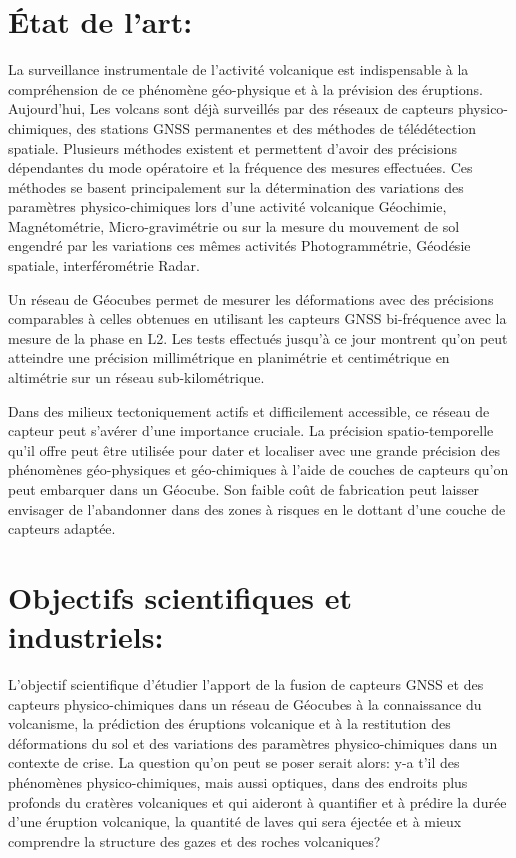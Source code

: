 \documentclass{themeensg}
\begin{document}
\begin{appendices}
\section*{État de l'art:}

La surveillance instrumentale de l'activité volcanique est indispensable à la compréhension de ce phénomène géo-physique et à la prévision des éruptions. Aujourd'hui, Les volcans sont déjà surveillés par des réseaux de capteurs physico-chimiques, des stations GNSS permanentes et des méthodes de télédétection spatiale. Plusieurs méthodes existent et permettent d'avoir des précisions dépendantes du mode opératoire et la fréquence des mesures effectuées. Ces méthodes se basent principalement sur la détermination des variations des paramètres physico-chimiques lors d'une activité volcanique Géochimie, Magnétométrie, Micro-gravimétrie ou sur la mesure du mouvement de sol engendré par les variations ces mêmes activités Photogrammétrie, Géodésie spatiale, interférométrie Radar.

Un réseau de Géocubes permet de mesurer les déformations avec des précisions comparables à celles obtenues en utilisant les capteurs GNSS bi-fréquence avec la mesure de la phase en L2. Les tests effectués jusqu'à ce jour montrent qu'on peut atteindre une précision millimétrique en planimétrie et centimétrique en altimétrie sur un réseau sub-kilométrique.

Dans des milieux tectoniquement actifs et difficilement accessible, ce réseau de capteur peut s'avérer d'une importance cruciale. La précision spatio-temporelle qu'il offre peut être utilisée pour dater et localiser avec une grande précision des phénomènes géo-physiques et géo-chimiques à l'aide de couches de capteurs qu'on peut embarquer dans un Géocube. Son faible coût de fabrication peut laisser envisager de l'abandonner dans des zones à risques en le dottant d'une couche de capteurs adaptée.

\section*{Objectifs scientifiques et industriels:}

L'objectif scientifique d'étudier l'apport de la fusion de capteurs GNSS et des capteurs physico-chimiques dans un réseau de Géocubes à la connaissance du volcanisme, la prédiction des éruptions volcanique et à la restitution des déformations du sol et des variations des paramètres physico-chimiques dans un contexte de crise. La question qu'on peut se poser serait alors: y-a t'il des phénomènes physico-chimiques, mais aussi optiques, dans des endroits plus profonds du cratères volcaniques et qui aideront à quantifier et à prédire la durée d'une éruption volcanique, la quantité de laves qui sera éjectée et à mieux comprendre la structure des gazes et des roches volcaniques?


\end{appendices}
\end{document}

